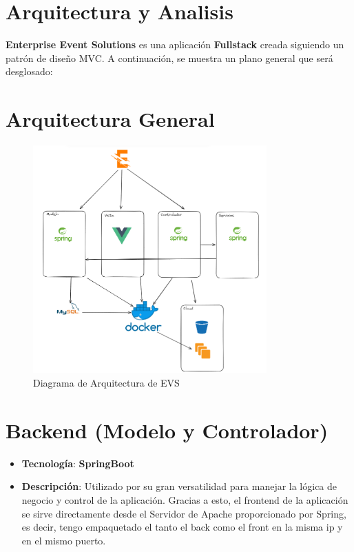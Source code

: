 

\section{Arquitectura y Analisis}
\textbf{Enterprise Event Solutions} es una aplicación \textbf{Fullstack} creada siguiendo un patrón de diseño MVC. A continuación, se muestra un plano general
que será desglosado:

\section*{Arquitectura General}
\begin{figure}[h]
    \centering
    \includegraphics[width=0.8\textwidth]{Arquitectura.png} 
    \caption{Diagrama de Arquitectura de EVS}
    \label{fig:mvc_architecture}
\end{figure}
\newpage

\section*{Backend (Modelo y Controlador)}

\begin{itemize}
    \item \textbf{Tecnología}: \textbf{SpringBoot}
    \item \textbf{Descripción}: Utilizado por su gran versatilidad para manejar la lógica de negocio y control de la aplicación. Gracias a esto, el frontend
    de la aplicación se sirve directamente desde el Servidor de Apache proporcionado por Spring, es decir, tengo empaquetado el tanto el back como el front en la misma ip
    y en el mismo puerto.
\end{itemize}


